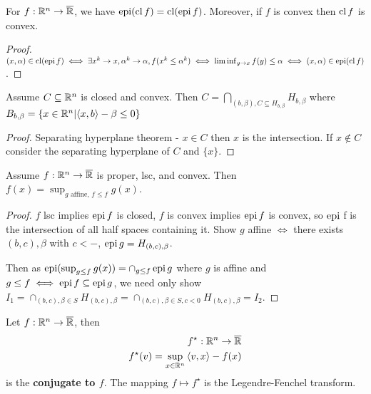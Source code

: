 \begin{thm}
  \label{sec:conjugate-functions-3}
  For $f: \mathbb{R}^{n} \rightarrow \overline {\mathbb{R}}$, we have $\operatorname*{epi} (\operatorname*{cl} f) =
  \operatorname*{cl} (\operatorname*{epi} f)$.  Moreover, if $f$ is convex then $\operatorname*{cl} f$ is convex.
\end{thm}

\begin{proof}
  $(x, \alpha) \in \operatorname*{cl}(\operatorname*{epi} f) \iff \exists x^{k} \rightarrow x,
  \alpha^{k} \rightarrow \alpha, f(x^{k} \leq \alpha^{k}) \iff
  \liminf_{y \rightarrow x} f(y) \leq \alpha \iff (x, \alpha) \in \operatorname*{epi}
  (\operatorname*{cl} f)$.
\end{proof}

\begin{thm}
  \label{sec:conjugate-functions-4}
  Assume $C \subseteq \mathbb{R}^{n}$ is closed and convex.  Then $C =
  \bigcap_{(b, \beta), C \subseteq H_{b, \beta}} H_{b, \beta}$ where
  $B_{b, \beta} = \{ x \in \R^{n} | \IP{x, b} - \beta \leq 0 \} $
\end{thm}

\begin{proof}
  Separating hyperplane theorem - $x \in C$ then $x$ is the
  intersection. If $x \notin C$ consider the separating hyperplane of
  $C$ and $\{ x \} $.
\end{proof}

\begin{thm}
  \label{sec:conjugate-functions-5}
  Assume $f: \mathbb{R}^{n} \rightarrow \overline {\mathbb{R}}$ is proper, lsc, and
  convex.  Then $f(x) = \sup_{\text{$g$ affine, $f \leq f$}} g(x)$.
\end{thm}

\begin{proof}
  $f$ lsc implies $\operatorname*{epi} f$ is closed, $f$ is convex implies $\operatorname*{epi} f$ is
  convex, so $\operatorname*{epi} $ f is the intersection of all half spaces
  containing it.  Show $g$ affine $\iff$ there exists $(b, c), \beta$
  with $c < -$, $\operatorname*{epi} g = H_{(b, c), \beta}$.

  Then as $\operatorname*{epi} (\sup_{g \leq f} g(x)) = \cap_{g \leq f} \operatorname*{epi} g$
  where $g$ is affine and $g \leq f \iff \operatorname*{epi} f \subseteq \operatorname*{epi} g$, we
  need only show $I_{1} = \cap_{(b, c), \beta \in S} H_{(b, c), \beta}
  = \cap_{(b, c), \beta \in S, c < 0} H_{(b, c), \beta} = I_{2}$.
\end{proof}

\begin{defn}
  \label{sec:conjugate-functions-6}
  Let $f: \mathbb{R}^{n} \rightarrow \overline {\mathbb{R}}$, then
  \begin{align}
    \label{eq:8}
    f^{\star}: \R^{n} \rightarrow \overline \R \\
    f^{\star}(v) = \sup_{x \in \R^{n}} \IP{v, x} - f(x)
  \end{align} is the \textbf{conjugate to $f$}.  The mapping $f
  \mapsto f^{\star}$ is the Legendre-Fenchel transform.
\end{defn}


